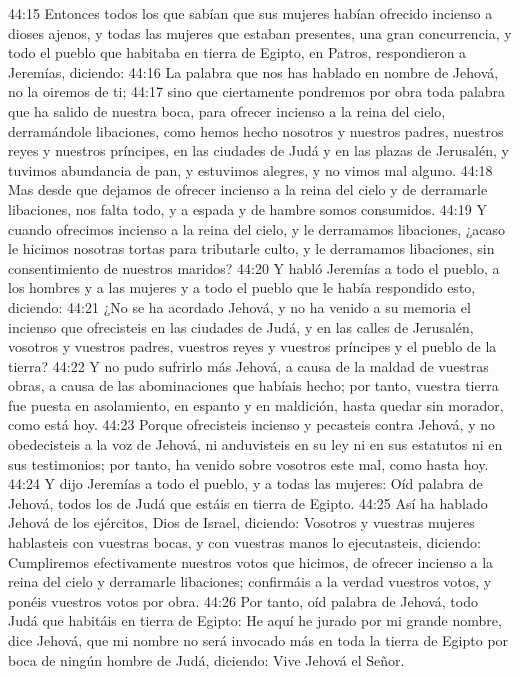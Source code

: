44:15 Entonces todos los que sabían que sus mujeres habían ofrecido incienso a dioses ajenos, y todas las mujeres que estaban presentes, una gran concurrencia, y todo el pueblo que habitaba en tierra de Egipto, en Patros, respondieron a Jeremías, diciendo: 
44:16 La palabra que nos has hablado en nombre de Jehová, no la oiremos de ti; 
44:17 sino que ciertamente pondremos por obra toda palabra que ha salido de nuestra boca, para ofrecer incienso a la reina del cielo, derramándole libaciones, como hemos hecho nosotros y nuestros padres, nuestros reyes y nuestros príncipes, en las ciudades de Judá y en las plazas de Jerusalén, y tuvimos abundancia de pan, y estuvimos alegres, y no vimos mal alguno. 
44:18 Mas desde que dejamos de ofrecer incienso a la reina del cielo y de derramarle libaciones, nos falta todo, y a espada y de hambre somos consumidos. 
44:19 Y cuando ofrecimos incienso a la reina del cielo, y le derramamos libaciones, ¿acaso le hicimos nosotras tortas para tributarle culto, y le derramamos libaciones, sin consentimiento de nuestros maridos? 
44:20 Y habló Jeremías a todo el pueblo, a los hombres y a las mujeres y a todo el pueblo que le había respondido esto, diciendo: 
44:21 ¿No se ha acordado Jehová, y no ha venido a su memoria el incienso que ofrecisteis en las ciudades de Judá, y en las calles de Jerusalén, vosotros y vuestros padres, vuestros reyes y vuestros príncipes y el pueblo de la tierra? 
44:22 Y no pudo sufrirlo más Jehová, a causa de la maldad de vuestras obras, a causa de las abominaciones que habíais hecho; por tanto, vuestra tierra fue puesta en asolamiento, en espanto y en maldición, hasta quedar sin morador, como está hoy. 
44:23 Porque ofrecisteis incienso y pecasteis contra Jehová, y no obedecisteis a la voz de Jehová, ni anduvisteis en su ley ni en sus estatutos ni en sus testimonios; por tanto, ha venido sobre vosotros este mal, como hasta hoy. 
44:24 Y dijo Jeremías a todo el pueblo, y a todas las mujeres: Oíd palabra de Jehová, todos los de Judá que estáis en tierra de Egipto. 
44:25 Así ha hablado Jehová de los ejércitos, Dios de Israel, diciendo: Vosotros y vuestras mujeres hablasteis con vuestras bocas, y con vuestras manos lo ejecutasteis, diciendo: Cumpliremos efectivamente nuestros votos que hicimos, de ofrecer incienso a la reina del cielo y derramarle libaciones; confirmáis a la verdad vuestros votos, y ponéis vuestros votos por obra. 
44:26 Por tanto, oíd palabra de Jehová, todo Judá que habitáis en tierra de Egipto: He aquí he jurado por mi grande nombre, dice Jehová, que mi nombre no será invocado más en toda la tierra de Egipto por boca de ningún hombre de Judá, diciendo: Vive Jehová el Señor. 
